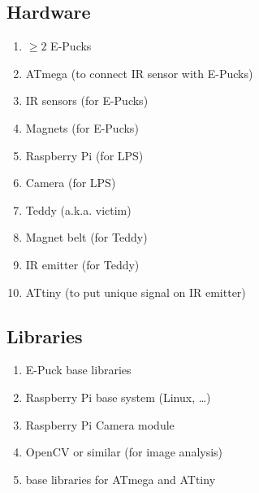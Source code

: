\documentclass[a4paper,parskip,headheight=38pt]{scrartcl} %
\begin{document}
\subsection{Hardware}
\begin{enumerate}[label=\hardware]
\item $\ge 2$ E-Pucks
\item ATmega (to connect IR sensor with E-Pucks)
\item IR sensors (for E-Pucks)
\item Magnets (for E-Pucks)
\item Raspberry Pi (for LPS)
\item Camera (for LPS)
\item Teddy (a.k.a. victim)
\item Magnet belt (for Teddy)
\item IR emitter (for Teddy)
\item ATtiny (to put unique signal on IR emitter)
\end{enumerate}

\subsection{Libraries}
\begin{enumerate}[label=\libs]
\item E-Puck base libraries
\item Raspberry Pi base system (Linux, \ldots)
\item Raspberry Pi Camera module
\item OpenCV or similar (for image analysis)
\item base libraries for ATmega and ATtiny
\end{enumerate}
\end{document}
